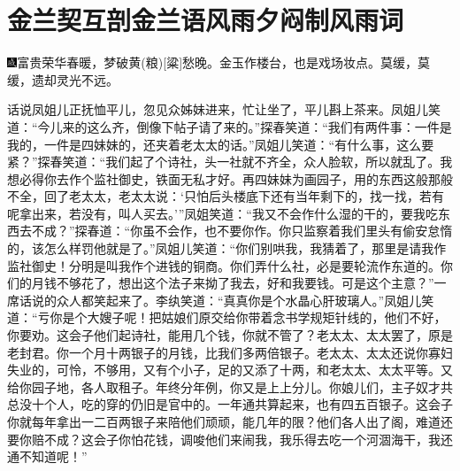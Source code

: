 

\chapter{金兰契互剖金兰语\hspace{.5em}风雨夕闷制风雨词}

{\includegraphics[width=3mm]{../Images/00005}富贵荣华春暖，梦破黄{{(粮)}}{[}粱{]}愁晚。金玉作楼台，也是戏场妆点。莫缓，莫缓，遗却灵光不远。}

话说凤姐儿正抚恤平儿，忽见众姊妹进来，忙让坐了，平儿斟上茶来。凤姐儿笑道：``今儿来的这么齐，倒像下帖子请了来的。''探春笑道：``我们有两件事：一件是我的，一件是四妹妹的，还夹着老太太的话。''凤姐儿笑道：``有什么事，这么要紧？''探春笑道：``我们起了个诗社，头一社就不齐全，众人脸软，所以就乱了。我想必得你去作个监社御史，铁面无私才好。再四妹妹为画园子，用的东西这般那般不全，回了老太太，老太太说：`只怕后头楼底下还有当年剩下的，找一找，若有呢拿出来，若没有，叫人买去。'''凤姐笑道：``我又不会作什么湿的干的，要我吃东西去不成？''探春道：``你虽不会作，也不要你作。你只监察着我们里头有偷安怠惰的，该怎么样罚他就是了。''凤姐儿笑道：``你们别哄我，我猜着了，那里是请我作监社御史！分明是叫我作个进钱的铜商。你们弄什么社，必是要轮流作东道的。你们的月钱不够花了，想出这个法子来拗了我去，好和我要钱。可是这个主意？''一席话说的众人都笑起来了。李纨笑道：``真真你是个水晶心肝玻璃人。''凤姐儿笑道：``亏你是个大嫂子呢！把姑娘们原交给你带着念书学规矩针线的，他们不好，你要劝。这会子他们起诗社，能用几个钱，你就不管了？老太太、太太罢了，原是老封君。你一个月十两银子的月钱，比我们多两倍银子。老太太、太太还说你寡妇失业的，可怜，不够用，又有个小子，足的又添了十两，和老太太、太太平等。又给你园子地，各人取租子。年终分年例，你又是上上分儿。你娘儿们，主子奴才共总没十个人，吃的穿的仍旧是官中的。一年通共算起来，也有四五百银子。这会子你就每年拿出一二百两银子来陪他们顽顽，能几年的限？他们各人出了阁，难道还要你赔不成？这会子你怕花钱，调唆他们来闹我，我乐得去吃一个河涸海干，我还通不知道呢！''

